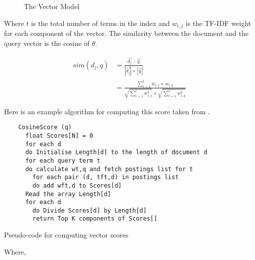 \begin{figure}[!htbp] %
  \centering
\caption[Vector Model]{The Vector Model}
\label{fig:VM}
\end{figure}

Where $t$ is the total number of terms in the index and $w_{i,j}$ is the TF-IDF weight for each component of the vector. The similarity between the document and the query vector is the cosine of $\theta$.

\begin{equation}
  \begin{split}
  sim(d_j,q) &= \frac{\vec{d_j} \ \cdot \ \vec{q}}{|\vec{d_j}| \times |\vec{q}|}\\
  &= \frac{\sum_{i=1}^{t}w_{i,j} \times w_{i,q}}
  {\sqrt{\sum_{i=1}^{t}w_{i,j}^{2}} \times \sqrt{\sum_{i=1}^{t}w_{i,q}^{2}}}
  \end{split}
  \label{eq:sim2}
\end{equation}

Here is an example algorithm for computing this score taken from \autocite[p.125]{Manning2009}.

\begin{listing}[htb]
  \begin{verbatim}
    CosineScore (q)
      float Scores[N] = 0
      for each d
      do Initialise Length[d] to the length of document d
      for each query term t
      do calculate wt,q and fetch postings list for t
        for each pair (d, tft,d) in postings list
        do add wft,d to Scores[d]
      Read the array Length[d]
      for each d
      	do Divide Scores[d] by Length[d]
      	return Top K components of Scores[]
  \end{verbatim}
\caption[Pseudo-code for computing vector scores]{Pseudo-code for computing vector scores}
\label{code:VectorScores}
\end{listing}

Where,\\
 \\
 \\
 \\
 \\
 \\
 \\
 \\
 \\
 

